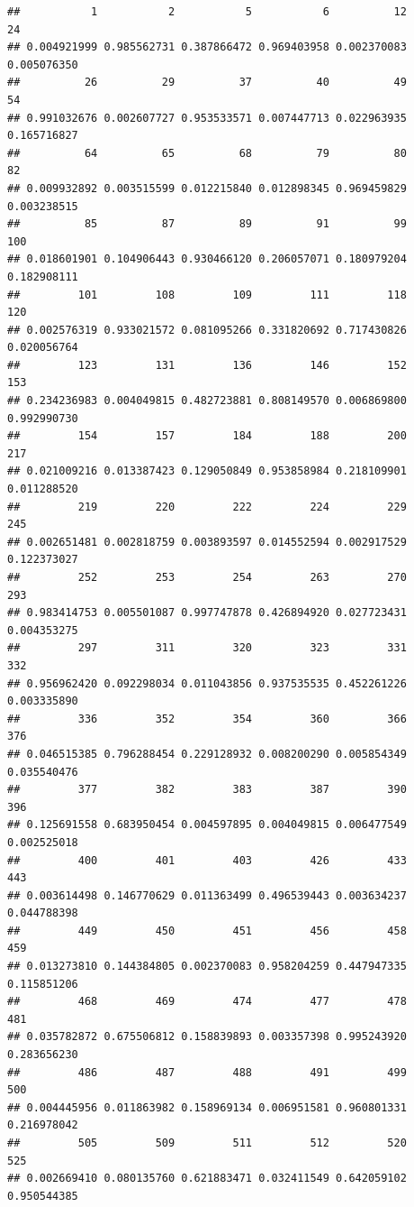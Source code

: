 \documentclass[
]{article}
\begin{document}
\begin{verbatim}
##           1           2           5           6          12          24 
## 0.004921999 0.985562731 0.387866472 0.969403958 0.002370083 0.005076350 
##          26          29          37          40          49          54 
## 0.991032676 0.002607727 0.953533571 0.007447713 0.022963935 0.165716827 
##          64          65          68          79          80          82 
## 0.009932892 0.003515599 0.012215840 0.012898345 0.969459829 0.003238515 
##          85          87          89          91          99         100 
## 0.018601901 0.104906443 0.930466120 0.206057071 0.180979204 0.182908111 
##         101         108         109         111         118         120 
## 0.002576319 0.933021572 0.081095266 0.331820692 0.717430826 0.020056764 
##         123         131         136         146         152         153 
## 0.234236983 0.004049815 0.482723881 0.808149570 0.006869800 0.992990730 
##         154         157         184         188         200         217 
## 0.021009216 0.013387423 0.129050849 0.953858984 0.218109901 0.011288520 
##         219         220         222         224         229         245 
## 0.002651481 0.002818759 0.003893597 0.014552594 0.002917529 0.122373027 
##         252         253         254         263         270         293 
## 0.983414753 0.005501087 0.997747878 0.426894920 0.027723431 0.004353275 
##         297         311         320         323         331         332 
## 0.956962420 0.092298034 0.011043856 0.937535535 0.452261226 0.003335890 
##         336         352         354         360         366         376 
## 0.046515385 0.796288454 0.229128932 0.008200290 0.005854349 0.035540476 
##         377         382         383         387         390         396 
## 0.125691558 0.683950454 0.004597895 0.004049815 0.006477549 0.002525018 
##         400         401         403         426         433         443 
## 0.003614498 0.146770629 0.011363499 0.496539443 0.003634237 0.044788398 
##         449         450         451         456         458         459 
## 0.013273810 0.144384805 0.002370083 0.958204259 0.447947335 0.115851206 
##         468         469         474         477         478         481 
## 0.035782872 0.675506812 0.158839893 0.003357398 0.995243920 0.283656230 
##         486         487         488         491         499         500 
## 0.004445956 0.011863982 0.158969134 0.006951581 0.960801331 0.216978042 
##         505         509         511         512         520         525 
## 0.002669410 0.080135760 0.621883471 0.032411549 0.642059102 0.950544385 

\end{verbatim}
\end{document}
